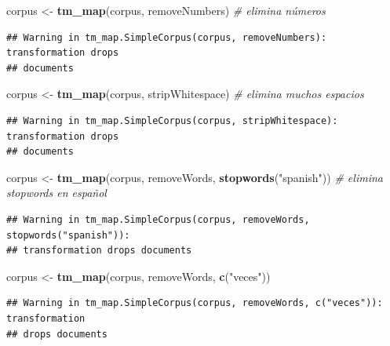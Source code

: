 \documentclass[
]{article}
\newenvironment{Shaded}{\begin{snugshade}}{\end{snugshade}}
\newcommand{\CommentTok}[1]{\textcolor[rgb]{0.56,0.35,0.01}{\textit{#1}}}
\newcommand{\FunctionTok}[1]{\textcolor[rgb]{0.13,0.29,0.53}{\textbf{#1}}}
\newcommand{\NormalTok}[1]{#1}
\newcommand{\OtherTok}[1]{\textcolor[rgb]{0.56,0.35,0.01}{#1}}
\newcommand{\StringTok}[1]{\textcolor[rgb]{0.31,0.60,0.02}{#1}}
\begin{document}
\begin{Shaded}
\begin{Highlighting}[]
\NormalTok{corpus }\OtherTok{\textless{}{-}} \FunctionTok{tm\_map}\NormalTok{(corpus, removeNumbers)                        }\CommentTok{\# elimina números}
\end{Highlighting}
\end{Shaded}

\begin{verbatim}
## Warning in tm_map.SimpleCorpus(corpus, removeNumbers): transformation drops
## documents
\end{verbatim}

\begin{Shaded}
\begin{Highlighting}[]
\NormalTok{corpus }\OtherTok{\textless{}{-}} \FunctionTok{tm\_map}\NormalTok{(corpus, stripWhitespace)                      }\CommentTok{\# elimina muchos espacios}
\end{Highlighting}
\end{Shaded}

\begin{verbatim}
## Warning in tm_map.SimpleCorpus(corpus, stripWhitespace): transformation drops
## documents
\end{verbatim}

\begin{Shaded}
\begin{Highlighting}[]
\NormalTok{corpus }\OtherTok{\textless{}{-}} \FunctionTok{tm\_map}\NormalTok{(corpus, removeWords, }\FunctionTok{stopwords}\NormalTok{(}\StringTok{"spanish"}\NormalTok{))    }\CommentTok{\# elimina stopwords en español}
\end{Highlighting}
\end{Shaded}

\begin{verbatim}
## Warning in tm_map.SimpleCorpus(corpus, removeWords, stopwords("spanish")):
## transformation drops documents
\end{verbatim}

\begin{Shaded}
\begin{Highlighting}[]
\NormalTok{corpus }\OtherTok{\textless{}{-}} \FunctionTok{tm\_map}\NormalTok{(corpus, removeWords, }\FunctionTok{c}\NormalTok{(}\StringTok{"veces"}\NormalTok{))}
\end{Highlighting}
\end{Shaded}

\begin{verbatim}
## Warning in tm_map.SimpleCorpus(corpus, removeWords, c("veces")): transformation
## drops documents
\end{verbatim}
\end{document}
